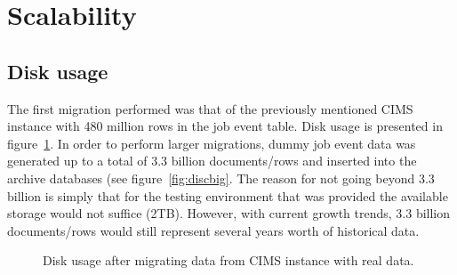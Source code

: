 

\section{Scalability}
\subsection{Disk usage}
The first migration performed was that of the previously mentioned CIMS instance with 480 million rows in the job event table. Disk usage is presented in figure~\ref{fig:disc}. In order to perform larger migrations, dummy job event data was generated up to a total of 3.3 billion documents/rows and inserted into the archive databases (see figure~\ref{fig:discbig}. The reason for not going beyond 3.3 billion is simply that for the testing environment that was provided the available storage would not suffice (2TB). However, with current growth trends, 3.3 billion documents/rows would still represent several years worth of historical data.

\begin{figure}[h!]
\centering
{}
\caption{Disk usage after migrating data from CIMS instance with real data.}
\label{fig:disc}
\end{figure}

